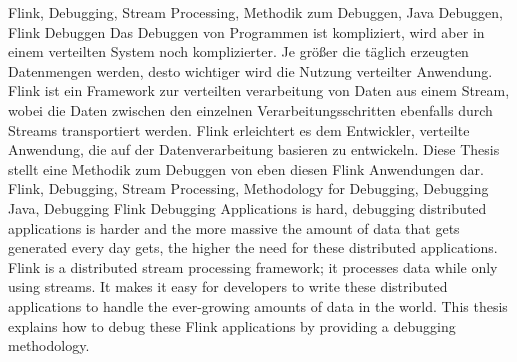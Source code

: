 \documentclass[draft=false
              ,paper=a4
              ,twoside=false
              ,fontsize=11pt
              ,headsepline
              ,BCOR10mm
              ,DIV11
              ]{scrbook}
\begin{document}

\frontmatter

\maketitle

\onehalfspacing

\HAWAbstractPage
{Flink, Debugging, Stream Processing, Methodik zum Debuggen, Java Debuggen, Flink Debuggen}%
{Das Debuggen von Programmen ist kompliziert, wird aber in einem verteilten System noch komplizierter. Je größer die täglich erzeugten Datenmengen werden, desto wichtiger wird die Nutzung verteilter Anwendung. Flink ist ein Framework zur verteilten verarbeitung von Daten aus einem Stream, wobei die Daten zwischen den einzelnen Verarbeitungsschritten ebenfalls durch Streams transportiert werden. Flink erleichtert es dem Entwickler, verteilte Anwendung, die auf der Datenverarbeitung basieren zu entwickeln. Diese Thesis stellt eine Methodik zum Debuggen von eben diesen Flink Anwendungen dar.}
{Flink, Debugging, Stream Processing, Methodology for Debugging, Debugging Java, Debugging Flink}%
{Debugging Applications is hard, debugging distributed applications is harder and the more massive the amount of data that gets generated every day gets, the higher the need for these distributed applications. Flink is a distributed stream processing framework; it processes data while only using streams. It makes it easy for developers to write these distributed applications to handle the ever-growing amounts of data in the world. This thesis explains how to debug these Flink applications by providing a debugging methodology.}

\newpage
\singlespacing

\tableofcontents
\newpage
\lstlistoflistings
\listoffigures
\end{document}

